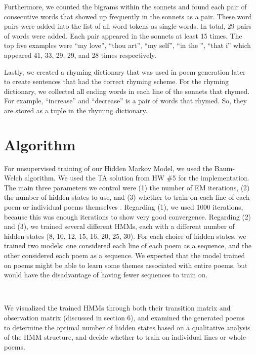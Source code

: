 Furthermore, we counted the bigrams within the sonnets and found each pair of consecutive words that showed up frequently in the sonnets as a pair. These word pairs were added into the list of all word tokens as single words. In total, 29 pairs of words were added. Each pair appeared in the sonnets at least 15 times. The top five examples were ``my love'', ``thou art'', ``my self'', ``in the '', ``that i'' which appeared 41, 33, 29, 29, and 28 times respectively.

Lastly, we created a rhyming dictionary that was used in poem generation later to create sentences that had the correct rhyming scheme. For the rhyming dictionary, we collected all ending words in each line of the sonnets that rhymed. For example, ``increase'' and ``decrease'' is a pair of words that rhymed. So, they are stored as a tuple in the rhyming dictionary.


\section{Algorithm}

\medskip

For unsupervised training of our Hidden Markov Model, we used the Baum-Welch algorithm. We used the TA solution from HW \#5 for the implementation. The main three parameters we control were (1) the number of EM iterations, (2) the number of hidden states to use, and (3) whether to train on each line of each poem or individual poems themselves . Regarding (1), we used 1000 iterations, because this was enough iterations to show very good convergence. Regarding (2) and (3), we trained several different HMMs, each with a different number of hidden states (8, 10, 12, 15, 16, 20, 25, 30). For each choice of hidden states, we trained two models: one considered each line of each poem as a sequence, and the other considered each poem as a sequence. We expected that the model trained on poems might be able to learn some themes associated with entire poems, but would have the disadvantage of having fewer sequences to train on.

~

We visualized the trained HMMs through both their transition matrix and observation matrix (discussed in section 6), and examined the generated poems to determine the optimal number of hidden states based on a qualitative analysis of the HMM structure, and decide whether to train on individual lines or whole poems.

~

